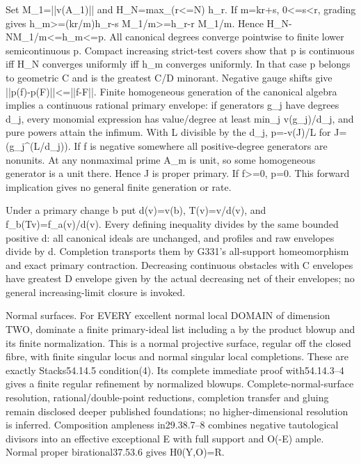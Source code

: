 Set M\_1=||v(A\_1)|| and H\_N=max\_(r\textless{}=N) h\_r. If m=kr+s, 0\textless{}=s\textless{}r, grading gives h\_m\textgreater{}=(kr/m)h\_r-s M\_1/m\textgreater{}=h\_r-r M\_1/m. Hence H\_N-NM\_1/m\textless{}=h\_m\textless{}=p. All canonical degrees converge pointwise to finite lower semicontinuous p. Compact increasing strict-test covers show that p is continuous iff H\_N converges uniformly iff h\_m converges uniformly. In that case p belongs to geometric C and is the greatest C/D minorant. Negative gauge shifts give ||p(f)-p(F)||\textless{}=||f-F||. Finite homogeneous generation of the canonical algebra implies a continuous rational primary envelope: if generators g\_j have degrees d\_j, every monomial expression has value/degree at least min\_j v(g\_j)/d\_j, and pure powers attain the infimum. With L divisible by the d\_j, p=-v(J)/L for J=(g\_j\textasciicircum{}(L/d\_j)). If f is negative somewhere all positive-degree generators are nonunits. At any nonmaximal prime A\_m is unit, so some homogeneous generator is a unit there. Hence J is proper primary. If f\textgreater{}=0, p=0. This forward implication gives no general finite generation or rate.

Under a primary change b put d(v)=v(b), T(v)=v/d(v), and f\_b(Tv)=f\_a(v)/d(v). Every defining inequality divides by the same bounded positive d: all canonical ideals are unchanged, and profiles and raw envelopes divide by d. Completion transports them by G331's all-support homeomorphism and exact primary contraction. Decreasing continuous obstacles with C envelopes have greatest D envelope given by the actual decreasing net of their envelopes; no general increasing-limit closure is invoked.

Normal surfaces. For EVERY excellent normal local DOMAIN of dimension TWO, dominate a finite primary-ideal list including a by the product blowup and its finite normalization. This is a normal projective surface, regular off the closed fibre, with finite singular locus and normal singular local completions. These are exactly Stacks54.14.5 condition(4). Its complete immediate proof with54.14.3--4 gives a finite regular refinement by normalized blowups. Complete-normal-surface resolution, rational/double-point reductions, completion transfer and gluing remain disclosed deeper published foundations; no higher-dimensional resolution is inferred. Composition ampleness in29.38.7--8 combines negative tautological divisors into an effective exceptional E with full support and O(-E) ample. Normal proper birational37.53.6 gives H0(Y,O)=R.

